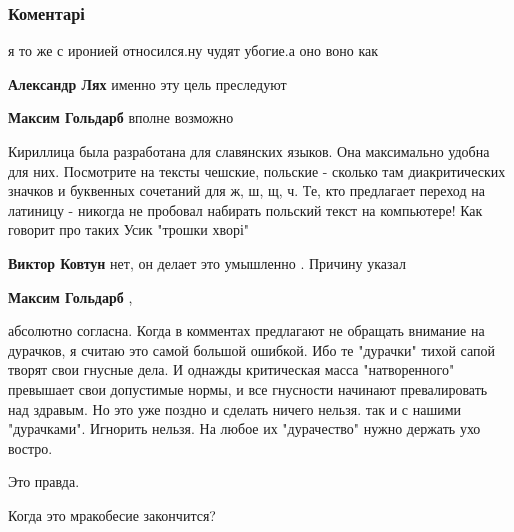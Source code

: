  
 
 
 
 
\subsubsection{Коментарі}

\begin{itemize} %
я то же с иронией относился.ну чудят убогие.а оно воно как

\begin{itemize} %
\textbf{Александр Лях} именно эту цель преследуют

\textbf{Максим Гольдарб} вполне возможно
\end{itemize} %


Кириллица была разработана для славянских языков. Она максимально удобна для
них. Посмотрите на тексты чешские, польские - сколько там диакритических
значков и буквенных сочетаний для ж, ш, щ, ч. Те, кто предлагает переход на
латиницу - никогда не пробовал набирать польский текст на компьютере! Как
говорит про таких Усик "трошки хворі"

\begin{itemize} %
\textbf{Виктор Ковтун} нет, он делает это умышленно . Причину указал

\textbf{Максим Гольдарб} , 

абсолютно согласна. Когда в комментах предлагают не обращать внимание на
дурачков, я считаю это самой большой ошибкой. Ибо те "дурачки" тихой сапой
творят свои гнусные дела. И однажды критическая масса "натворенного" превышает
свои допустимые нормы, и все гнусности начинают превалировать над здравым. Но
это уже поздно и сделать ничего нельзя. так и с нашими "дурачками". Игнорить
нельзя. На любое их "дурачество" нужно держать ухо востро.

\end{itemize} %

Это правда.

Когда это мракобесие закончится?


\end{itemize}

